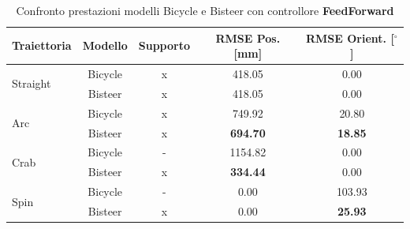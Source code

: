 \begin{table}[h]
    \centering
    \begin{tabular}{@{}lcccc@{}}
        \toprule
        \textbf{Traiettoria} & \textbf{Modello} & \textbf{Supporto} & \textbf{RMSE Pos. [mm]}      & \textbf{RMSE Orient. [$^\circ$]} \\
        \midrule
        \multirow{2}{*}{Straight}
                             & Bicycle          & x                 & 418.05                       & 0.00                             \\
                             & Bisteer          & x                 & 418.05                       & 0.00                             \\
        \midrule
        \multirow{2}{*}{Arc}
                             & Bicycle          & x                 & 749.92                       & 20.80                            \\
                             & Bisteer          & x                 & \textbf{694.70}              & \textbf{18.85}                   \\
        \midrule
        \multirow{2}{*}{Crab}
                             & Bicycle          & -                 & \textcolor{failure}{1154.82} & 0.00                             \\
                             & Bisteer          & x                 & \textbf{334.44}              & 0.00                             \\
        \midrule
        \multirow{2}{*}{Spin}
                             & Bicycle          & -                 & 0.00                         & \textcolor{failure}{103.93}      \\
                             & Bisteer          & x                 & 0.00                         & \textbf{25.93}                   \\
        \bottomrule
    \end{tabular}
    \caption{Confronto prestazioni modelli Bicycle e Bisteer con controllore \textbf{FeedForward}}
    \label{tab:feedforward_comparison_summary}
\end{table}

